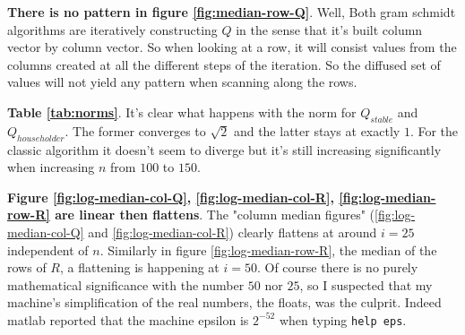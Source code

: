 \documentclass[a4paper,11pt]{article}
\begin{document}
\textbf{There is no pattern in figure \ref{fig:median-row-Q}}. Well, Both
gram schmidt algorithms are iteratively constructing $Q$ in the sense
that it's built column vector by column vector. So when looking at a row,
it will consist values from the columns created at all the different
steps of the iteration. So the diffused set of values will not yield any
pattern when scanning along the rows.

\textbf{Table \ref{tab:norms}}. It's clear what happens with the norm
for $Q_{stable}$ and $Q_{householder}$. The former converges to $\sqrt{2}$
and the latter stays at exactly $1$. For the classic algorithm it
doesn't seem to diverge but it's still increasing significantly when
increasing $n$ from $100$ to $150$.

\textbf{Figure \ref{fig:log-median-col-Q}, \ref{fig:log-median-col-R},
\ref{fig:log-median-row-R} are linear then flattens}. The
"column median figures" (\ref{fig:log-median-col-Q} and
\ref{fig:log-median-col-R}) clearly flattens at around $i=25$
independent of $n$. Similarly in figure \ref{fig:log-median-row-R}, the
median of the rows of $R$, a flattening is happening at $i=50$. Of
course there is no purely mathematical significance with the number $50$
nor $25$, so I suspected that my machine's simplification of the real
numbers, the floats, was the culprit. Indeed matlab reported that
the machine epsilon is $2^{-52}$ when typing \texttt{help eps}.
\end{document}
